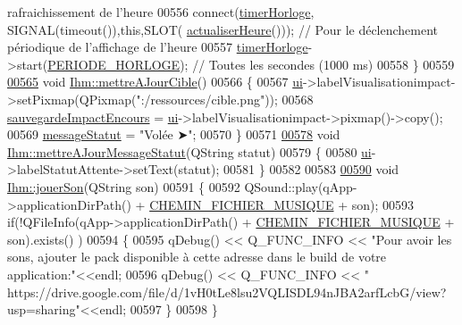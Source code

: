 \begin{DoxyCode}
{       rafraichissement de l'heure}
00556     connect(\hyperlink{class_ihm_a21ea35b212966fa2805241ea6237d351}{timerHorloge}, SIGNAL(timeout()),\textcolor{keyword}{this},SLOT(
      \hyperlink{class_ihm_ad8b3b13e638ebbfbe8159d00d99ff88f}{actualiserHeure}())); \textcolor{comment}{// Pour le déclenchement périodique de l'affichage de l'heure}
00557     \hyperlink{class_ihm_a21ea35b212966fa2805241ea6237d351}{timerHorloge}->start(\hyperlink{ihm_8h_abe1de80d8a7149cf82da305f032d7b1e}{PERIODE\_HORLOGE});  \textcolor{comment}{// Toutes les secondes (1000 ms)}
00558 \}
00559 
\hyperlink{class_ihm_a3c504c417aa2d3efd82ac5feded16895}{00565} \textcolor{keywordtype}{void} \hyperlink{class_ihm_a3c504c417aa2d3efd82ac5feded16895}{Ihm::mettreAJourCible}()
00566 \{
00567     \hyperlink{class_ihm_a0ac5f47856566ceeeca1720109bf70ea}{ui}->labelVisualisationimpact->setPixmap(QPixmap(\textcolor{stringliteral}{":/ressources/cible.png"}));
00568     \hyperlink{class_ihm_a659c67bf5d1ba3104fb10f23d8b91b37}{sauvegardeImpactEncours} = \hyperlink{class_ihm_a0ac5f47856566ceeeca1720109bf70ea}{ui}->labelVisualisationimpact->pixmap()->copy();
00569     \hyperlink{class_ihm_a31a25b36e5560142cb156b8b1a25965f}{messageStatut} = \textcolor{stringliteral}{"Volée ➤"};
00570 \}
00571 
\hyperlink{class_ihm_a7837ec36fbac1ca96d049ad27263b951}{00578} \textcolor{keywordtype}{void} \hyperlink{class_ihm_ab80e655c95fca8e1113343bdbd3d3586}{Ihm::mettreAJourMessageStatut}(QString statut)
00579 \{
00580     \hyperlink{class_ihm_a0ac5f47856566ceeeca1720109bf70ea}{ui}->labelStatutAttente->setText(statut);
00581 \}
00582 
00583 
\hyperlink{class_ihm_a55f2d106f7af9ed2e84f78822e23bb97}{00590} \textcolor{keywordtype}{void} \hyperlink{class_ihm_a55f2d106f7af9ed2e84f78822e23bb97}{Ihm::jouerSon}(QString son)
00591 \{
00592     QSound::play(qApp->applicationDirPath() + \hyperlink{ihm_8h_aaf7f17312e64cf24f4c93fc657e5594f}{CHEMIN\_FICHIER\_MUSIQUE} + son);
00593     \textcolor{keywordflow}{if}(!QFileInfo(qApp->applicationDirPath() + \hyperlink{ihm_8h_aaf7f17312e64cf24f4c93fc657e5594f}{CHEMIN\_FICHIER\_MUSIQUE} + son).exists()
      )
00594     \{
00595         qDebug() << Q\_FUNC\_INFO << \textcolor{stringliteral}{"Pour avoir les sons, ajouter le pack disponible à cette adresse dans le
       build de votre application:"}<<endl;
00596         qDebug() << Q\_FUNC\_INFO << \textcolor{stringliteral}{"
      https://drive.google.com/file/d/1vH0tLe8lsu2VQLISDL94nJBA2arfLcbG/view?usp=sharing"}<<endl;
00597     \}
00598 \}

\end{DoxyCode}
